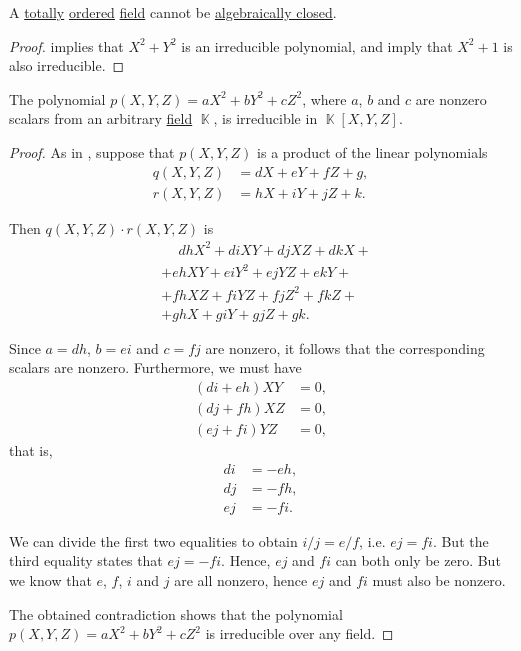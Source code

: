 \begin{corollary}\label{thm:ordered_field_not_algebraically_closed}
  A \hyperref[def:totally_ordered_set]{totally} \hyperref[def:ordered_semiring]{ordered} \hyperref[def:field]{field} cannot be \hyperref[def:algebraically_closed_field]{algebraically closed}.
\end{corollary}
\begin{proof}
   implies that \( X^2 + Y^2 \) is an irreducible polynomial, and  imply that \( X^2 + 1 \) is also irreducible.
\end{proof}

\begin{proposition}\label{thm:axx_byy_czz_irreducible}
  The polynomial \( p(X, Y, Z) = a X^2 + b Y^2 + c Z^2 \), where \( a \), \( b \) and \( c \) are nonzero scalars from an arbitrary \hyperref[def:field]{field} \( \BbbK \), is irreducible in \( \BbbK[X, Y, Z] \).
\end{proposition}
\begin{proof}
  As in , suppose that \( p(X, Y, Z) \) is a product of the linear polynomials
  \begin{align*}
    q(X, Y, Z) &= d X + e Y + f Z + g, \\
    r(X, Y, Z) &= h X + i Y + j Z + k.
  \end{align*}

  Then \( q(X, Y, Z) \cdot r(X, Y, Z) \) is
  \begin{align*}
    &\phantom{{}+{}}
    d h X^2 + d i X Y + d j X Z + d k X
    + \\ &+
    e h X Y + e i Y^2 + e j Y Z + e k Y
    + \\ &+
    f h X Z + f i Y Z + f j Z^2 + f k Z
    + \\ &+
    g h X + g i Y + g j Z + g k.
  \end{align*}

  Since \( a = dh \), \( b = ei \) and \( c = fj \) are nonzero, it follows that the corresponding scalars are nonzero. Furthermore, we must have
  \begin{align*}
    (d i + e h) X Y &= 0, \\
    (d j + f h) X Z &= 0, \\
    (e j + f i) Y Z &= 0,
  \end{align*}
  that is,
  \begin{align*}
    d i &= - e h, \\
    d j &= - f h, \\
    e j &= - f i.
  \end{align*}

  We can divide the first two equalities to obtain \( i / j = e / f \), i.e. \( ej = fi \). But the third equality states that \( ej = -fi \). Hence, \( ej \) and \( fi \) can both only be zero. But we know that \( e \), \( f \), \( i \) and \( j \) are all nonzero, hence \( ej \) and \( fi \) must also be nonzero.

  The obtained contradiction shows that the polynomial \( p(X, Y, Z) = a X^2 + b Y^2 + c Z^2 \) is irreducible over any field.
\end{proof}

